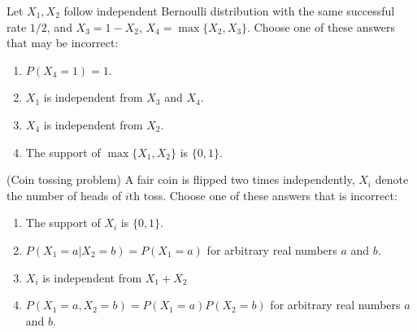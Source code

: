 \documentclass[poll_tutorial_format]{subfiles}
\begin{document}
	
	\begin{exercise}
		Let $X_1, X_2$ follow independent Bernoulli distribution with the same successful rate $1/2$, and $X_3=1-X_2$, $X_4=\max\{X_2, X_3\}$. 
		Choose one of these answers that may be incorrect: %
		\begin{enumerate}
			\item $P(X_4=1)=1$.
			\item $X_1$ is independent from $X_3$ and $X_4$.
			\item $X_4$ is independent from $X_2$.
			\item The support of $\max\{X_1,X_2\}$ is $\{0,1\}$.
		\end{enumerate}
	\end{exercise}
	
	
	\begin{exercise}
		(Coin tossing problem) A fair coin is flipped two times independently, $X_i$ denote the number of heads of $i$th toss. 
		Choose one of these answers that is incorrect: %
		\begin{enumerate}
			\item The support of $X_i$ is $\{0,1\}$.
			\item $P(X_1=a|X_2=b)=P(X_1=a)$ for arbitrary real numbers $a$ and $b$.		
			\item $X_i$ is independent from $X_1+X_2$
			\item $P(X_1=a, X_2=b)=P(X_1=a)P(X_2=b)$ for arbitrary real numbers $a$ and $b$.		
		\end{enumerate}
	\end{exercise}
	 
	
	
	
	
	
	
\end{document}
